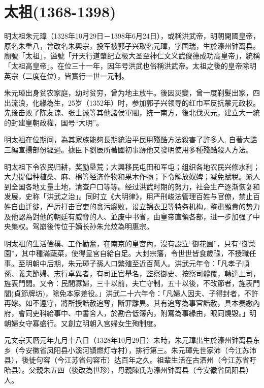 
\section{太祖\tiny(1368-1398)}

明太祖朱元璋（1328年10月29日－1398年6月24日），或稱洪武帝，明朝開國皇帝，原名朱重八，曾改名朱興宗，投军被郭子兴取名元璋，字国瑞，生於濠州钟离县。廟號「太祖」，谥號「开天行道肇纪立极大圣至神仁文义武俊德成功高皇帝」，統稱「太祖高皇帝」。在位三十一年，因年号洪武也俗稱洪武帝。太祖之後的皇帝除明英宗（二度在位），皆實行一世一元制。

朱元璋出身贫农家庭，幼时贫穷，曾为地主放牛。後因災變，曾一度剃髮出家，四出流浪，化緣為生，25岁（1352年）时，参加郭子兴领导的红巾军反抗蒙元政权。先後击败了陈友谅、张士诚等其他諸侯軍閥，统一南方，後北伐灭元，建立大一統的封建皇朝政權，国号“大明”。

明太祖在位期间，為其家族能夠長期統治平民用殘酷方法殺害了許多人, 自著大誥三編宣揚部份經過。據臣下劉辰所著國初事跡他又發明使用多種殘酷殺人方法。

明太祖下令农民归耕，奖励垦荒；大興移民屯田和军屯；组织各地农民兴修水利；大力提倡种植桑、麻、棉等经济作物和果木作物；下令解放奴婢；减免賦稅。派人到全国各地丈量土地，清查户口等等。经过洪武时期的努力，社会生产逐渐恢复和发展，史称「洪武之治」。同时立《大明律》，用严刑峻法管理百姓与官僚，禁止百姓自由迁徙，严厉打击官吏的贪污腐败，设立锦衣卫等特务机构，整肅顯貴的势力及他認為對他的朝廷有威脅的人、並废中书省，由皇帝直領各部，进一步加强了中央集权。驾崩後传位于嫡长孙朱允炆為明惠宗。

明太祖的生活儉樸、工作勤奮，在南京的皇宮內，沒有設立“御花園”，只有“御菜園”，其中種滿蔬菜，使得皇宮自給自足。大封宗籓，令世世皆食歲祿，不授職任事。至明朝中后期，朱元璋子孫人口繁殖至近百萬人。洪武元年令：「凡孝子順孫、義夫節婦、志行卓異者，有司正官舉名，監察御史、按察司體覆，轉達上司，旌表門閭。又令：民間寡婦，三十以前，夫亡守制，五十以後，不改節者，旌表門閭(貞節牌坊)，除免本家差役。」洪武二十六年令：「凡婦人因夫、子得封者，不許再嫁。如不遵守，將所授誥赦追奪，斷罪離異。其有追奪為事官誥赦，具本奏繳內府，會同吏科給事中、中書舍人，於勘合低簿內，附寫為事緣由，眼同燒毀。」明朝婦女守寡盛行。又創立明朝入宮婦女生殉制度。

元文宗天曆元年九月十八日（1328年10月29日）未時，朱元璋出生於濠州钟离县东乡（今安徽省凤阳县小溪河镇燃灯寺村），排行第三。朱元璋先世家沛（今江苏沛县），後徙句容（今江苏省句容市）达百年之久。祖辈生活在古泗州（今江苏省盱眙县）。父親朱五四（後改為世珍），母親陳氏为濠州钟离县（今安徽省凤阳县）人。

